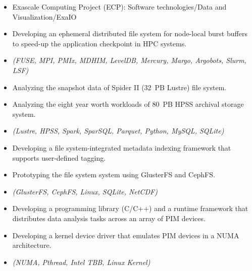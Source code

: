 \begin{itemize}
    \item {Exascale Computing Project (ECP): Software technologies/Data and Visualization/ExaIO}
    \item {Developing an ephemeral distributed file system for node-local burst buffers
           to speed-up the application checkpoint in HPC systems.}
    \item {\it\small (FUSE, MPI, PMIx, MDHIM, LevelDB, Mercury, Margo, Argobots, Slurm, LSF)}
\end{itemize}

\begin{itemize}
    \item {Analyzing the snapshot data of Spider II (32~PB Lustre) file system.}
    \item {Analyzing the eight year worth workloads of 80~PB HPSS archival storage system.}
    \item {\it\small (Lustre, HPSS, Spark, SparSQL, Parquet, Python, MySQL, SQLite)}
\end{itemize}

\begin{itemize}
    \item {Developing a file system-integrated metadata indexing framework that supports user-defined tagging.}
    \item {Prototyping the file system system using GlusterFS and CephFS.}
    \item {\it\small (GlusterFS, CephFS, Linux, SQLite, NetCDF)}
\end{itemize}

\begin{itemize}
    \item {Developing a programming library (C/C++) and a runtime framework
        that distributes data analysis tasks across an array of PIM devices.}
    \item {Developing a kernel device driver that emulates PIM devices in a NUMA architecture.}
    \item {\it\small(NUMA, Pthread, Intel TBB, Linux Kernel)}
\end{itemize}

